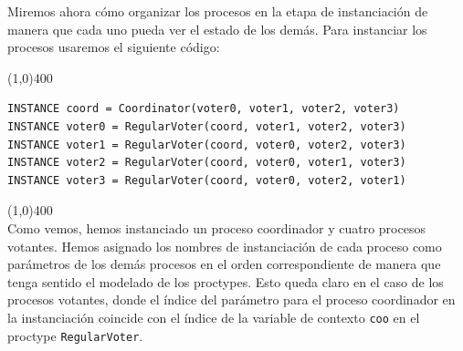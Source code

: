\documentclass[pdftex,a4paper,12pt]{book}
\begin{document}
Miremos ahora c\'omo organizar los procesos en la etapa de instanciaci\'on de manera que cada uno pueda ver el estado de los dem\'as. Para instanciar los procesos usaremos el siguiente c\'odigo:

\noindent \line(1,0){400}
\begin{verbatim}
INSTANCE coord = Coordinator(voter0, voter1, voter2, voter3)
INSTANCE voter0 = RegularVoter(coord, voter1, voter2, voter3)
INSTANCE voter1 = RegularVoter(coord, voter0, voter2, voter3)
INSTANCE voter2 = RegularVoter(coord, voter0, voter1, voter3)
INSTANCE voter3 = RegularVoter(coord, voter0, voter2, voter1)
\end{verbatim}
\noindent \line(1,0){400}
~\\

Como vemos, hemos instanciado un proceso coordinador y cuatro procesos votantes. Hemos asignado los nombres de instanciaci\'on de cada proceso como par\'ametros de los dem\'as procesos en el orden correspondiente de manera que tenga sentido el modelado de los proctypes. Esto queda claro en el caso de los procesos votantes, donde el \'indice del par\'ametro para el proceso coordinador en la instanciaci\'on coincide con el \'indice de la variable de contexto \texttt{coo} en el proctype \texttt{RegularVoter}.
\end{document}
